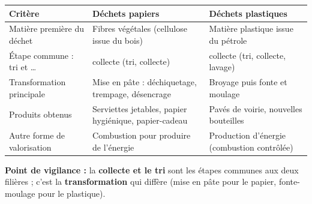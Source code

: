 \documentclass[11pt]{article}
\begin{document}
\begin{corrige}
\begin{center}
\begin{tabularx}{\linewidth}{|l|X|X|}
\hline
\rowcolor{popblueL} \textbf{Critère} & \textbf{Déchets papiers} & \textbf{Déchets plastiques} \\
\hline
Matière première du déchet & Fibres végétales (cellulose issue du bois) & Matière plastique issue du pétrole \\
\hline
Étape commune : tri et \ldots & collecte (tri, collecte) & collecte (tri, collecte, lavage) \\
\hline
Transformation principale & Mise en pâte : déchiquetage, trempage, désencrage & Broyage puis fonte et moulage \\
\hline
Produits obtenus & Serviettes jetables, papier hygiénique, papier-cadeau & Pavés de voirie, nouvelles bouteilles \\
\hline
Autre forme de valorisation & Combustion pour produire de l'énergie & Production d'énergie (combustion contrôlée) \\
\hline
\end{tabularx}
\end{center}
\textbf{Point de vigilance :} la \textbf{collecte et le tri} sont les étapes communes aux deux filières ; c'est la \textbf{transformation} qui diffère (mise en pâte pour le papier, fonte-moulage pour le plastique).
\end{corrige}
\end{document}
